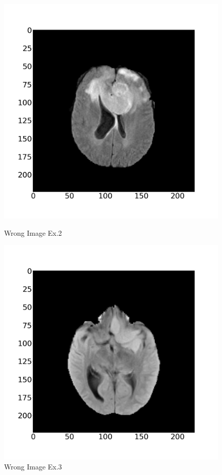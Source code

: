 \documentclass[11pt,a4j]{jarticle}
\begin{document}
\begin{figure}[ht]
\begin{minipage}{0.32\hsize}
		\includegraphics[width=\linewidth]{../2_MedicalImageClassification/Dataset/1662.jpg}
		\vspace{-1cm}
		\renewcommand{\figurename}{Fig}
		\caption{Wrong Image Ex.2}
		\label{wp12}
	\end{minipage}
	\begin{minipage}{0.32\hsize}
		\centering
		\includegraphics[width=\linewidth]{../2_MedicalImageClassification/Dataset/2314.jpg}
		\vspace{-1cm}
		\renewcommand{\figurename}{Fig}
		\caption{Wrong Image Ex.3}
		\label{wp13}
	\end{minipage}
\end{figure}
\end{document}
